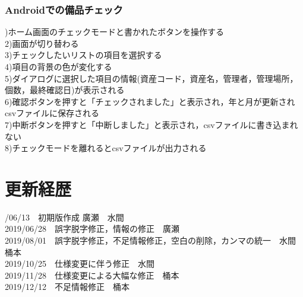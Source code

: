 \documentclass[11pt,a4j]{jarticle}
\begin{document}
\subsubsection{Androidでの備品チェック}
)ホーム画面のチェックモードと書かれたボタンを操作する
\\2)画面が切り替わる
\\3)チェックしたいリストの項目を選択する
\\4)項目の背景の色が変化する
\\5)ダイアログに選択した項目の情報(資産コード，資産名，管理者，管理場所，個数，最終確認日)が表示される
\\6)確認ボタンを押すと「チェックされました」と表示され，年と月が更新されcsvファイルに保存される
\\7)中断ボタンを押すと「中断しました」と表示され，csvファイルに書き込まれない
\\8)チェックモードを離れるとcsvファイルが出力される

  \newpage
  \section{更新経歴}
  /06/13　初期版作成	廣瀬　水間
  \\2019/06/28　誤字脱字修正，情報の修正　廣瀬
  \\2019/08/01　誤字脱字修正，不足情報修正，空白の削除，カンマの統一　水間　桶本
  \\2019/10/25　仕様変更に伴う修正　水間
　\\2019/11/28　仕様変更による大幅な修正　桶本
　\\2019/12/12　不足情報修正　桶本
\end{document}
